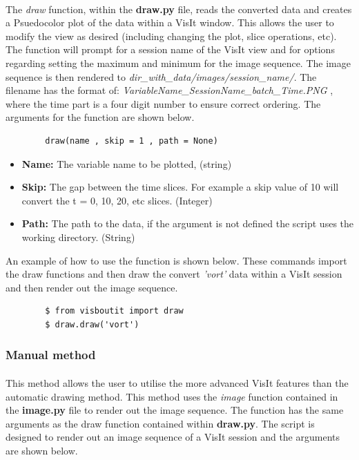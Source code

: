\documentclass[12pt,a4paper]{article}
\begin{document}
	\paragraph{}
	The \textit{draw} function, within the \textbf{draw.py} file, reads the converted data and creates a Psuedocolor plot of the data within a VisIt window. This allows the user to modify the view as desired (including changing the plot, slice operations, etc). The function will prompt for a session name of the VisIt view and for options regarding setting the maximum and minimum for the image sequence. The image sequence is then rendered to \textit{dir\_with\_data/images/session\_name/}. The filename has the format of: \textit{VariableName\_SessionName\_batch\_Time.PNG} , where the time part is a four digit number to ensure correct ordering. The arguments for the function are shown below.
	
	\begin{verbatim}
		draw(name , skip = 1 , path = None)
	\end{verbatim}
	
	\begin{itemize}
		\item{\textbf{Name:} The variable name to be plotted, (string)}
		
		\item{\textbf{Skip:} The gap between the time slices. For example a skip value of 10 will convert the t = 0, 10, 20, etc slices. (Integer)}
		
		\item{\textbf{Path:} The path to the data, if the argument is not defined the script uses the working directory. (String)}
	\end{itemize}

	An example of how to use the function is shown below. These commands import the draw functions and then draw the convert \textit{'vort'} data within a VisIt session and then render out the image sequence.
	
	\begin{verbatim}
		$ from visboutit import draw
		$ draw.draw('vort')
	\end{verbatim}
	
	
	\subsubsection{Manual method}
	\paragraph{}
	This method allows the user to utilise the more advanced VisIt features than the automatic drawing method. This method uses the \textit{image} function contained in the \textbf{image.py} file to render out the image sequence. The function has the same arguments as the draw function contained within \textbf{draw.py}. The script is designed to render out an image sequence of a VisIt session and the arguments are shown below.
	
\end{document}

